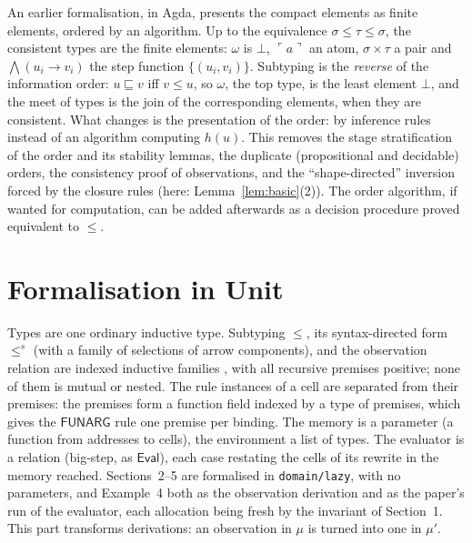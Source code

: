 \documentclass[11pt]{amsart}
\theoremstyle{definition}
\theoremstyle{remark}
\newcommand{\kw}[1]{\mathsf{#1}}
\newcommand{\at}[1]{\ulcorner #1\urcorner}
\begin{document}
An earlier formalisation, in Agda, presents the compact elements as finite
elements, ordered by an algorithm. Up to the equivalence $\sigma\le\tau\le\sigma$, the consistent types are the
finite elements: $\omega$ is $\bot$, $\at a$ an atom, $\sigma\times\tau$ a pair
and $\bigwedge(u_i\to v_i)$ the step function $\{(u_i,v_i)\}$. Subtyping is the
\emph{reverse} of the information order: $u\sqsubseteq v$ iff $v\le u$, so
$\omega$, the top type, is the least element $\bot$, and the meet of types is
the join of the corresponding elements, when they are consistent. What changes is
the presentation of the order: by inference rules instead of an algorithm
computing $h(u)$. This removes the stage stratification of the order and its
stability lemmas, the duplicate (propositional and decidable) orders, the
consistency proof of observations, and the ``shape-directed'' inversion forced
by the closure rules (here: Lemma~\ref{lem:basic}(2)). The order algorithm, if
wanted for computation, can be added afterwards as a decision procedure proved
equivalent to $\le$.

\section{Formalisation in Unit}

Types are one ordinary inductive type. Subtyping $\le$, its syntax-directed
form $\le^s$ (with a family of selections of arrow components), and the
observation relation are indexed inductive families \cite{CPM90,Dyb94}, with all
recursive premises positive; none of them is mutual or nested. The rule
instances of a cell are separated from their premises: the premises form a
function field indexed by a type of premises, which gives the
$\kw{FUNARG}$ rule one premise per binding. The memory is a parameter (a
function from addresses to cells), the environment a list of types. The
evaluator is a relation (big-step, as $\kw{Eval}$), each case restating the
cells of its rewrite in the memory reached. Sections~2--5 are formalised in
\texttt{domain/lazy}, with no parameters, and Example~4 both as the
observation derivation and as the paper's run of the evaluator, each
allocation being fresh by the invariant of Section~1. This part transforms
derivations: an observation in $\mu$ is turned into one in $\mu'$.
\end{document}

